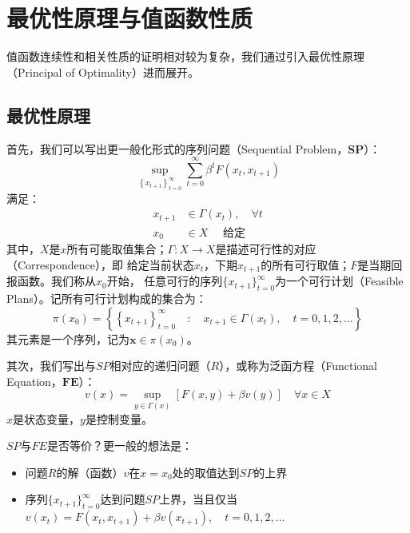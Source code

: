 
\section{最优性原理与值函数性质} \label{sec-value-f-property}

值函数连续性和相关性质的证明相对较为复杂，我们通过引入最优性原理（Principal of Optimality）进而展开。

\subsection{最优性原理}

首先，我们可以写出更一般化形式的序列问题（Sequential Problem，$\mathbf{SP}$）：
$$
\sup _{\left\{x_{t+1}\right\}_{t=0}^{\infty}} \sum_{t=0}^{\infty} \beta^t F\left(x_t, x_{t+1}\right)
$$
满足：
$$
\begin{aligned}
    x_{t+1} & \in \Gamma\left(x_t\right), \quad \forall t\\
    x_0 & \in X \quad \text { 给定 }
\end{aligned}
$$
其中，$X$是$x$所有可能取值集合；$\Gamma : X \rightarrow X$是描述可行性的对应（Correspondence），即
给定当前状态$x_t$，下期$x_{t+1}$的所有可行取值；$F$是当期回报函数。我们称从$x_0$开始，
任意可行的序列$\{x_{t+1}\}_{t=0}^{\infty}$为一个可行计划（Feasible Plans）。记所有可行计划构成的集合为：
$$\pi\left(x_0\right)=\left\{\left\{x_{t+1}\right\}_{t=0}^{\infty} \quad: \quad x_{t+1} \in \Gamma\left(x_t\right), 
    \quad t=0,1,2, \ldots\right\}$$
其元素是一个序列，记为$\boldsymbol{x}\in\pi\left(x_0\right)$。

其次，我们写出与$SP$相对应的递归问题（$R$），或称为泛函方程（Functional Equation，$\mathbf{FE}$）：
$$
v(x)=\sup _{y \in \Gamma(x)}[F(x, y)+\beta v(y)] \quad \forall x \in X
$$
$x$是状态变量，$y$是控制变量。

$SP$与$FE$是否等价？更一般的想法是：
\begin{itemize}
    \item 问题$R$的解（函数）$v$在$x=x_0$处的取值达到$SP$的上界
    \item 序列$\{x_{t+1}\}_{t=0}^{\infty}$达到问题$SP$上界，当且仅当
        $v\left(x_t\right)=F\left(x_t, x_{t+1}\right)+\beta v\left(x_{t+1}\right), \quad t=0,1,2, \ldots$
\end{itemize}

